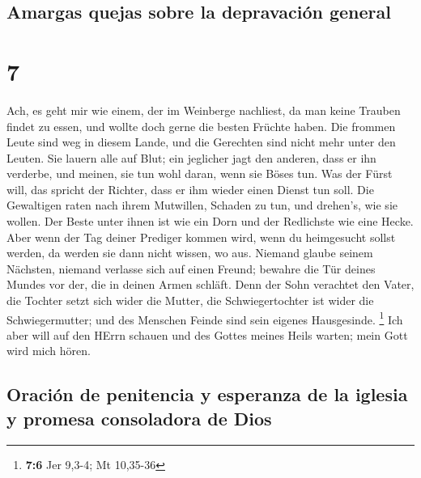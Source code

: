 \hypertarget{amargas-quejas-sobre-la-depravaciuxf3n-general}{%
\subsection{Amargas quejas sobre la depravación
general}\label{amargas-quejas-sobre-la-depravaciuxf3n-general}}

\hypertarget{section-6}{%
\section{7}\label{section-6}}

 Ach, es geht mir wie einem, der im Weinberge nachliest,
da man keine Trauben findet zu essen, und wollte doch gerne die besten
Früchte haben.  Die frommen Leute sind weg in diesem
Lande, und die Gerechten sind nicht mehr unter den Leuten. Sie lauern
alle auf Blut; ein jeglicher jagt den anderen, dass er ihn verderbe,
 und meinen, sie tun wohl daran, wenn sie Böses tun. Was
der Fürst will, das spricht der Richter, dass er ihm wieder einen Dienst
tun soll. Die Gewaltigen raten nach ihrem Mutwillen, Schaden zu tun, und
drehen's, wie sie wollen.  Der Beste unter ihnen ist wie
ein Dorn und der Redlichste wie eine Hecke. Aber wenn der Tag deiner
Prediger kommen wird, wenn du heimgesucht sollst werden, da werden sie
dann nicht wissen, wo aus.  Niemand glaube seinem
Nächsten, niemand verlasse sich auf einen Freund; bewahre die Tür deines
Mundes vor der, die in deinen Armen schläft.  Denn der
Sohn verachtet den Vater, die Tochter setzt sich wider die Mutter, die
Schwiegertochter ist wider die Schwiegermutter; und des Menschen Feinde
sind sein eigenes Hausgesinde. \footnote{\textbf{7:6} Jer 9,3-4; Mt
  10,35-36}  Ich aber will auf den HErrn schauen und des
Gottes meines Heils warten; mein Gott wird mich hören.

\hypertarget{oraciuxf3n-de-penitencia-y-esperanza-de-la-iglesia-y-promesa-consoladora-de-dios}{%
\subsection{Oración de penitencia y esperanza de la iglesia y promesa
consoladora de
Dios}\label{oraciuxf3n-de-penitencia-y-esperanza-de-la-iglesia-y-promesa-consoladora-de-dios}}

